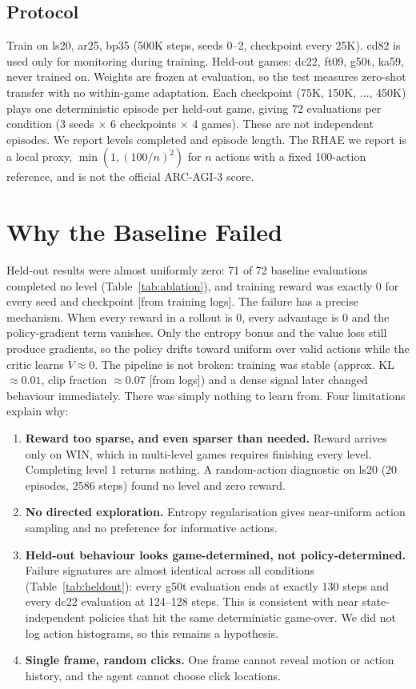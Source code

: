 \documentclass[11pt,a4paper]{article}
\begin{document}
\subsection*{Protocol}
Train on ls20, ar25, bp35 (500K steps, seeds 0--2, checkpoint every 25K). cd82 is used only for monitoring during training. Held-out games: dc22, ft09, g50t, ka59, never trained on. Weights are frozen at evaluation, so the test measures zero-shot transfer with no within-game adaptation. Each checkpoint (75K, 150K, $\ldots$, 450K) plays one deterministic episode per held-out game, giving 72 evaluations per condition (3 seeds $\times$ 6 checkpoints $\times$ 4 games). These are not independent episodes. We report levels completed and episode length. The RHAE we report is a local proxy, $\min(1,(100/n)^2)$ for $n$ actions with a fixed 100-action reference, and is not the official ARC-AGI-3 score.

\section{Why the Baseline Failed}

Held-out results were almost uniformly zero: 71 of 72 baseline evaluations completed no level (Table~\ref{tab:ablation}), and training reward was exactly 0 for every seed and checkpoint [from training logs]. The failure has a precise mechanism. When every reward in a rollout is 0, every advantage is 0 and the policy-gradient term vanishes. Only the entropy bonus and the value loss still produce gradients, so the policy drifts toward uniform over valid actions while the critic learns $V\approx0$. The pipeline is not broken: training was stable (approx. KL $\approx0.01$, clip fraction $\approx0.07$ [from logs]) and a dense signal later changed behaviour immediately. There was simply nothing to learn from. Four limitations explain why:

\begin{enumerate}
  \item \textbf{Reward too sparse, and even sparser than needed.} Reward arrives only on WIN, which in multi-level games requires finishing every level. Completing level 1 returns nothing. A random-action diagnostic on ls20 (20 episodes, 2586 steps) found no level and zero reward.
  \item \textbf{No directed exploration.} Entropy regularisation gives near-uniform action sampling and no preference for informative actions.
  \item \textbf{Held-out behaviour looks game-determined, not policy-determined.} Failure signatures are almost identical across all conditions (Table~\ref{tab:heldout}): every g50t evaluation ends at exactly 130 steps and every dc22 evaluation at 124--128 steps. This is consistent with near state-independent policies that hit the same deterministic game-over. We did not log action histograms, so this remains a hypothesis.
  \item \textbf{Single frame, random clicks.} One frame cannot reveal motion or action history, and the agent cannot choose click locations.
\end{enumerate}
\end{document}
